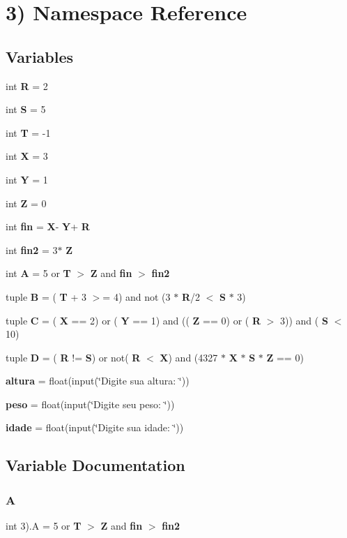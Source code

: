 \section{3) Namespace Reference}
\label{namespace3_08}
\subsection*{Variables}
\begin{DoxyCompactItemize}
\item 
int \textbf{ R} = 2
\item 
int \textbf{ S} = 5
\item 
int \textbf{ T} = -\/1
\item 
int \textbf{ X} = 3
\item 
int \textbf{ Y} = 1
\item 
int \textbf{ Z} = 0
\item 
int \textbf{ fin} = \textbf{ X}-\/\textbf{ Y}+\textbf{ R}
\item 
int \textbf{ fin2} = 3$\ast$\textbf{ Z}
\item 
int \textbf{ A} = 5 or \textbf{ T} $>$ \textbf{ Z} and \textbf{ fin} $>$ \textbf{ fin2}
\item 
tuple \textbf{ B} = (\textbf{ T} + 3 $>$= 4) and not (3 $\ast$ \textbf{ R}/2 $<$ \textbf{ S} $\ast$ 3)
\item 
tuple \textbf{ C} = (\textbf{ X} == 2) or (\textbf{ Y} == 1) and ((\textbf{ Z} == 0) or (\textbf{ R} $>$ 3)) and (\textbf{ S} $<$ 10)
\item 
tuple \textbf{ D} = (\textbf{ R} != \textbf{ S}) or not(\textbf{ R} $<$ \textbf{ X}) and (4327 $\ast$ \textbf{ X} $\ast$ \textbf{ S} $\ast$ \textbf{ Z} == 0)
\item 
\textbf{ altura} = float(input(\char`\"{}Digite sua altura\+: \char`\"{}))
\item 
\textbf{ peso} = float(input(\char`\"{}Digite seu peso\+: \char`\"{}))
\item 
\textbf{ idade} = float(input(\char`\"{}Digite sua idade\+: \char`\"{}))
\end{DoxyCompactItemize}


\subsection{Variable Documentation}
\mbox{\label{namespace3_08_a3586a4dafd3c32ae952c7d3cdffd060a}} 
\subsubsection{A}
{\footnotesize\ttfamily int 3).A = 5 or \textbf{ T} $>$ \textbf{ Z} and \textbf{ fin} $>$ \textbf{ fin2}}



